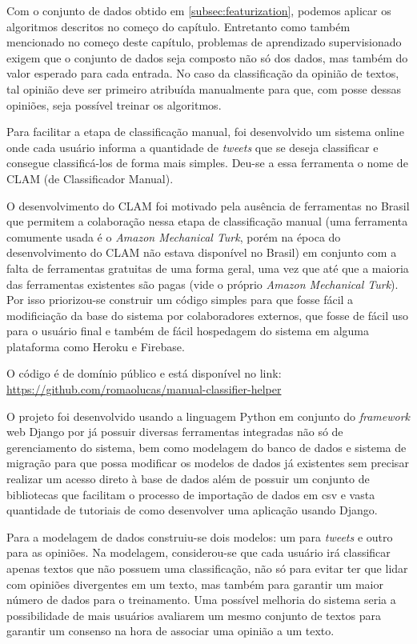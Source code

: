 Com o conjunto de dados obtido em \ref{subsec:featurization}, podemos aplicar os algoritmos 
descritos no começo do capítulo. Entretanto como também mencionado no começo deste capítulo,
problemas de aprendizado supervisionado exigem que o conjunto de dados seja composto não só dos
dados, mas também do valor esperado para cada entrada. No caso da classificação da opinião de
textos, tal opinião deve ser primeiro atribuída manualmente para que, com posse dessas opiniões,
seja possível treinar os algoritmos.

Para facilitar a etapa de classificação manual, foi desenvolvido um sistema online onde cada usuário
informa a quantidade de \textit{tweets} que se deseja classificar e consegue classificá-los de forma
mais simples. Deu-se a essa ferramenta o nome de CLAM (de Classificador Manual).

O desenvolvimento do CLAM foi motivado pela ausência de ferramentas no Brasil que permitem a
colaboração nessa etapa de classificação manual (uma ferramenta comumente usada é o \textit{Amazon
Mechanical Turk}, porém na época do desenvolvimento do CLAM não estava disponível no Brasil)
em conjunto com a falta de ferramentas gratuitas de 
uma forma geral, uma vez que até que a maioria das ferramentas existentes são pagas (vide o 
próprio \textit{Amazon Mechanical Turk}). Por isso priorizou-se construir um código simples
para que fosse fácil a modificiação da base do sistema por colaboradores externos,
que fosse de fácil uso para o usuário final e também de fácil hospedagem do sistema
em alguma plataforma como Heroku e Firebase.

O código é de domínio público e está disponível no link:
 \url{https://github.com/romaolucas/manual-classifier-helper}

O projeto foi desenvolvido usando a linguagem Python em conjunto do \textit{framework} web
Django por já possuir diversas ferramentas integradas não só de gerenciamento do sistema, bem como
modelagem do banco de dados e sistema de migração para que possa modificar os modelos de dados já
existentes sem precisar realizar um acesso direto à base de dados além de possuir um conjunto
de bibliotecas que facilitam o processo de importação de dados em csv e vasta quantidade de 
tutoriais de como desenvolver uma aplicação usando Django.

Para a modelagem de dados construiu-se dois modelos: um para \textit{tweets} e outro para
as opiniões.
Na modelagem, considerou-se que cada usuário irá classificar apenas textos que não 
possuem uma classificação, não só para evitar ter que lidar com opiniões divergentes em um texto,
mas também para garantir um maior número de dados para o treinamento. Uma possível melhoria
do sistema seria a possibilidade de mais usuários avaliarem um mesmo conjunto de textos para
garantir um consenso na hora de associar uma opinião a um texto.

